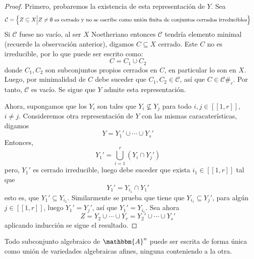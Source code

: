 \documentclass[12pt]{report}
\newcounter{it}
\theoremstyle{largebreak}
\newcommand\natint[1]{\ensuremath{\left[\!\left[ #1\right]\!\right]}}
\newcommand{\contradiction}{\ensuremath{\#_c}}
\newcommand{\bbm}[1]{\ensuremath{\mathbbm{#1}}}
\begin{document}
    \begin{proof}
        Primero, probaremos la existencia de esta representación de $Y$. Sea
        \begin{equation*}
            \mathcal{C}=\left\{Z\subseteq X\Big|Z\neq\emptyset\textup{ es cerrado y no se escribe como unión finita de conjuntos cerrados irreducibles} \right\}
        \end{equation*}
        Si $\mathcal{C}$ fuese no vacío, al ser $X$ Noetheriano entonces $\mathcal{C}$ tendría elemento minimal (recuerde la observación anterior), digamos $C\subseteq X$ cerrado. Este $C$ no es irreducible, por lo que puede ser escrito como:
        \begin{equation*}
            C=C_1\cup C_2
        \end{equation*}
        donde $C_1,C_2$ son subconjuntos propios cerrados en $C$, en particular lo son en $X$. Luego, por minimalidad de $C$ debe suceder que $C_1,C_2\in\mathcal{C}$, así que $C\in\mathcal{C}$\contradiction. Por tanto, $\mathcal{C}$ es vacío. Se sigue que $Y$ admite esta representación.

        Ahora, supongamos que los $Y_i$ son tales que $Y_i\nsubseteq Y_j$ para todo $i,j\in\natint{1,r}$, $i\neq j$. Consideremos otra representación de $Y$ con las mismas caracaterísticas, digamos
        \begin{equation*}
            Y=Y_1'\cup\cdots\cup Y_s'
        \end{equation*}
        Entonces,
        \begin{equation*}
            Y_1'=\bigcup_{ i=1}^r \left(Y_i\cap Y_j'\right)
        \end{equation*}
        pero, $Y_1'$ es cerrado irreducible, luego debe suceder que exista $i_1\in\natint{1,r}$ tal que
        \begin{equation*}
            Y_1'=Y_{i_1}\cap Y_1'
        \end{equation*}
        esto es, que $Y_1'\subseteq Y_{i_1}$. Similarmente se prueba    que tiene que $Y_{i_1}\subseteq Y_{ j}'$, para algún $j\in\natint{1,r}$, luego $Y_1'=Y_j'$, así que $Y_1'=Y_{i_1}$. Sea ahora
        \begin{equation*}
            Z=Y_2\cup\cdots\cup Y_r=Y_2'\cup\cdots\cup Y_s'
        \end{equation*}
        aplicando inducción se sigue el resultado.
    \end{proof}

    \begin{cor}
        Todo subconjunto algebraico de $\bbm{A}^n$ puede ser escrita de forma única como unión de variedades algebraicas afines, ninguna conteniendo a la otra. 
    \end{cor}
\end{document}
